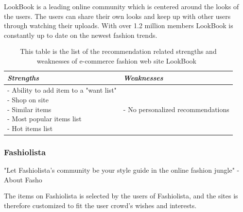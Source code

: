     LookBook is a leading online community which is centered around the looks of the users.
    The users can share their own looks and keep up with other users through watching their uploads.
    With over 1.2 million members LookBook is constantly up to date on the newest fashion trends.
    \begin{table}[H]
        \centering
        \begin{tabular}{l|l}
            \toprule
            \emph{Strengths} & \emph{Weaknesses} \\ \hline
            \pbox{9cm}{
                - Ability to add item to a "want list" \\
                - Shop on site \\
                - Similar items \\
                - Most popular items list \\
                - Hot items list
            } & \pbox{9cm}{
                - No personalized recommendations \\
            } \\ \bottomrule
        \end{tabular}
        \caption[Recommendation related strengths and weaknesses of LookBook~\cite{LookBook}]{This table is the list of the recommendation related strengths and weaknesses of e-commerce fashion web site LookBook~\cite{LookBook}}
        \label{table:ecommenreceLookBook}
    \end{table}

\subsubsection{Fashiolista} %
\label{par:fashiolista}
    "Let Fashiolista's community be your style guide in the online fashion jungle" - About Fasho~\cite{Fashiolista}

    The items on Fashiolista is selected by the users of Fashiolista, and the sites is therefore customized to fit the user crowd's wishes and interests.

